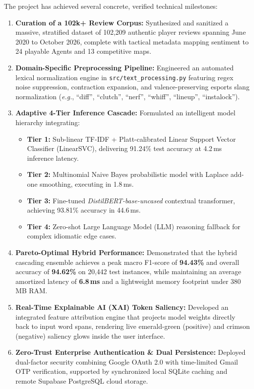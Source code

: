 The project has achieved several concrete, verified technical milestones:
\begin{enumerate}
    \item \textbf{Curation of a 102k+ Review Corpus:} Synthesized and sanitized a massive, stratified dataset of 102,209 authentic player reviews spanning June 2020 to October 2026, complete with tactical metadata mapping sentiment to 24 playable Agents and 13 competitive maps.
    \item \textbf{Domain-Specific Preprocessing Pipeline:} Engineered an automated lexical normalization engine in \texttt{src/text\_processing.py} featuring regex noise suppression, contraction expansion, and valence-preserving esports slang normalization (\textit{e.g.}, ``diff'', ``clutch'', ``nerf'', ``whiff'', ``lineup'', ``instalock'').
    \item \textbf{Adaptive 4-Tier Inference Cascade:} Formulated an intelligent model hierarchy integrating:
    \begin{itemize}
        \item \textbf{Tier 1:} Sub-linear TF-IDF + Platt-calibrated Linear Support Vector Classifier (LinearSVC), delivering 91.24\% test accuracy at 4.2\,ms inference latency.
        \item \textbf{Tier 2:} Multinomial Naive Bayes probabilistic model with Laplace add-one smoothing, executing in 1.8\,ms.
        \item \textbf{Tier 3:} Fine-tuned \textit{DistilBERT-base-uncased} contextual transformer, achieving 93.81\% accuracy in 44.6\,ms.
        \item \textbf{Tier 4:} Zero-shot Large Language Model (LLM) reasoning fallback for complex idiomatic edge cases.
    \end{itemize}
    \item \textbf{Pareto-Optimal Hybrid Performance:} Demonstrated that the hybrid cascading ensemble achieves a peak macro F1-score of \textbf{94.43\%} and overall accuracy of \textbf{94.62\%} on 20,442 test instances, while maintaining an average amortized latency of \textbf{6.8\,ms} and a lightweight memory footprint under 380\,MB RAM.
    \item \textbf{Real-Time Explainable AI (XAI) Token Saliency:} Developed an integrated feature attribution engine that projects model weights directly back to input word spans, rendering live emerald-green (positive) and crimson (negative) saliency glows inside the user interface.
    \item \textbf{Zero-Trust Enterprise Authentication \& Dual Persistence:} Deployed dual-factor security combining Google OAuth 2.0 with time-limited Gmail OTP verification, supported by synchronized local SQLite caching and remote Supabase PostgreSQL cloud storage.
\end{enumerate}


